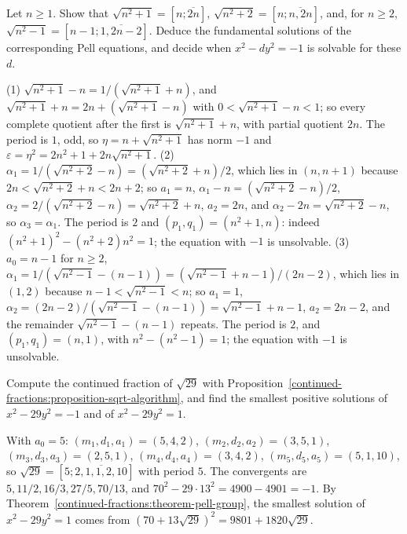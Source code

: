\begin{exercise}\label{continued-fractions:exercise-square-roots}
Let $n \geq 1$. Show that $\sqrt{n^2 + 1} = [n; \overline{2n}]$, $\sqrt{n^2 + 2} = [n; \overline{n, 2n}]$, and, for $n \geq 2$, $\sqrt{n^2 - 1} = [n - 1; \overline{1, 2n - 2}]$. Deduce the
fundamental solutions of the corresponding Pell equations, and decide when $x^2 - dy^2 = -1$ is solvable for these $d$.
\end{exercise}

\begin{solution}
(1) $\sqrt{n^2 + 1} - n = 1/(\sqrt{n^2 + 1} + n)$, and $\sqrt{n^2 + 1} + n = 2n + (\sqrt{n^2 + 1} - n)$ with $0 < \sqrt{n^2 + 1} - n < 1$; so every complete quotient after the first is
$\sqrt{n^2 + 1} + n$, with partial quotient $2n$. The period is $1$, odd, so $\eta = n + \sqrt{n^2 + 1}$ has norm $-1$ and $\varepsilon = \eta^2 = 2n^2 + 1 + 2n\sqrt{n^2 + 1}$.
(2) $\alpha_1 = 1/(\sqrt{n^2 + 2} - n) = (\sqrt{n^2 + 2} + n)/2$, which lies in $(n, n + 1)$ because $2n < \sqrt{n^2 + 2} + n < 2n + 2$; so $a_1 = n$,
$\alpha_1 - n = (\sqrt{n^2 + 2} - n)/2$, $\alpha_2 = 2/(\sqrt{n^2 + 2} - n) = \sqrt{n^2 + 2} + n$, $a_2 = 2n$, and $\alpha_2 - 2n = \sqrt{n^2 + 2} - n$, so $\alpha_3 = \alpha_1$. The period is $2$ and
$(p_1, q_1) = (n^2 + 1, n)$: indeed $(n^2 + 1)^2 - (n^2 + 2)n^2 = 1$; the equation with $-1$ is unsolvable. (3) $a_0 = n - 1$ for $n \geq 2$, $\alpha_1 = 1/(\sqrt{n^2 - 1} - (n - 1)) = (\sqrt{n^2 - 1} + n - 1)/(2n - 2)$,
which lies in $(1, 2)$ because $n - 1 < \sqrt{n^2 - 1} < n$; so $a_1 = 1$, $\alpha_2 = (2n - 2)/(\sqrt{n^2 - 1} - (n - 1)) = \sqrt{n^2 - 1} + n - 1$, $a_2 = 2n - 2$, and the remainder
$\sqrt{n^2 - 1} - (n - 1)$ repeats. The period is $2$, and $(p_1, q_1) = (n, 1)$, with $n^2 - (n^2 - 1) = 1$; the equation with $-1$ is unsolvable.
\end{solution}

\begin{exercise}\label{continued-fractions:exercise-pell-29}
Compute the continued fraction of $\sqrt{29}$ with Proposition~\ref{continued-fractions:proposition-sqrt-algorithm}, and find the smallest positive solutions of $x^2 - 29y^2 = -1$ and of
$x^2 - 29y^2 = 1$.
\end{exercise}

\begin{solution}
With $a_0 = 5$: $(m_1, d_1, a_1) = (5, 4, 2)$, $(m_2, d_2, a_2) = (3, 5, 1)$, $(m_3, d_3, a_3) = (2, 5, 1)$, $(m_4, d_4, a_4) = (3, 4, 2)$, $(m_5, d_5, a_5) = (5, 1, 10)$, so
$\sqrt{29} = [5; \overline{2, 1, 1, 2, 10}]$ with period $5$. The convergents are $5, 11/2, 16/3, 27/5, 70/13$, and $70^2 - 29 \cdot 13^2 = 4900 - 4901 = -1$. By
Theorem~\ref{continued-fractions:theorem-pell-group}, the smallest solution of $x^2 - 29y^2 = 1$ comes from $(70 + 13\sqrt{29})^2 = 9801 + 1820\sqrt{29}$.
\end{solution}

